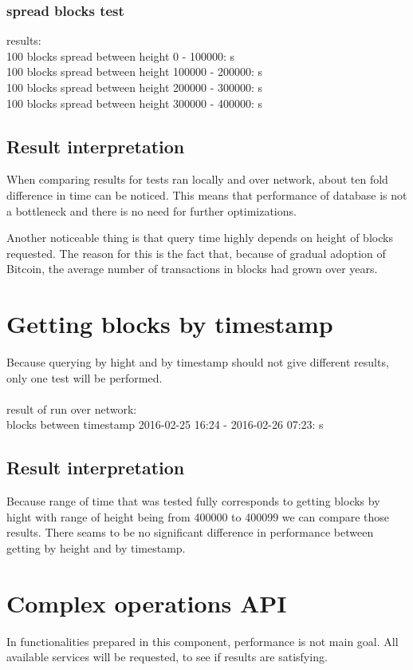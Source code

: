\documentclass[12pt, en, eng, oneside]{mgr}
\begin{document}
\subsubsection{spread blocks test}
results:
\\
100 blocks spread between height 0 - 100000: \quad \quad {} s\\
100 blocks spread between height 100000 - 200000:  s\\
100 blocks spread between height 200000 - 300000:  s\\
100 blocks spread between height 300000 - 400000:  s\\

\subsection{Result interpretation}
When comparing results for tests ran locally and over network, about ten fold difference in time can be noticed. This means that performance of database is not a bottleneck and there is no need for further optimizations.

Another noticeable thing is that query time highly depends on height of blocks requested. The reason for this is the fact that, because of gradual adoption of Bitcoin, the average number of transactions in blocks had grown over years. 

\section{Getting blocks by timestamp}
Because querying by hight and by timestamp should not give different results, only one test will be performed.
\\
\\
result of run over network:
\\
blocks between timestamp 2016-02-25 16:24 - 2016-02-26 07:23:  s

\subsection{Result interpretation}
Because range of time that was tested fully corresponds to getting blocks by hight with range of height being from 400000 to 400099 we can compare those results. There seams to be no significant difference in performance between getting by height and by timestamp.

\section{Complex operations API}
In functionalities prepared in this component, performance is not main goal. All available services will be requested, to see if results are satisfying.
\end{document}
